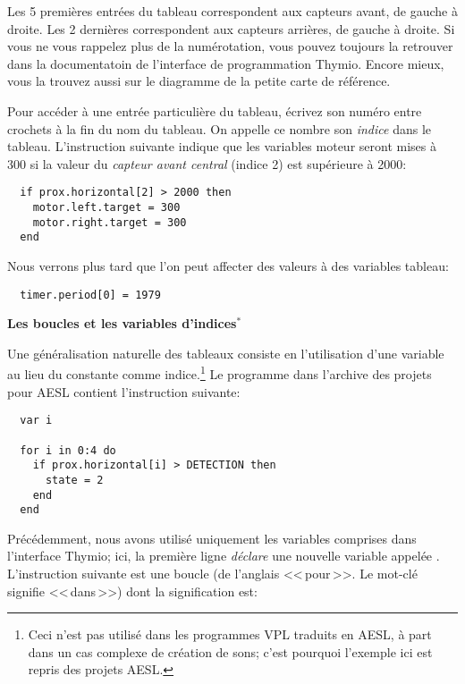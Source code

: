 Les 5 premières entrées du tableau correspondent aux capteurs avant, de gauche à droite.
Les 2 dernières correspondent aux capteurs arrières, de gauche à droite.
Si vous ne vous rappelez plus de la numérotation, vous pouvez toujours la retrouver 
dans la documentatoin de l'interface de programmation Thymio.
Encore mieux, vous la trouvez aussi sur le diagramme de la petite carte de référence.

Pour accéder à une entrée particulière du tableau, écrivez son numéro entre crochets à la fin 
du nom du tableau. On appelle ce nombre son \emph{indice} dans le tableau.
L'instruction suivante indique que les variables moteur seront mises à 300 si la valeur du \emph{capteur
avant central} (indice 2) est supérieure à 2000:

\begin{footnotesize}
\begin{verbatim}
  if prox.horizontal[2] > 2000 then
    motor.left.target = 300
    motor.right.target = 300
  end
\end{verbatim}
\end{footnotesize}

Nous verrons plus tard que l'on peut affecter des valeurs à des variables tableau:
\begin{footnotesize}
\begin{verbatim}
  timer.period[0] = 1979
\end{verbatim}
\end{footnotesize}

\textbf{\large Les boucles  et les variables d'indices$^*$}

Une généralisation naturelle des tableaux consiste en l'utilisation d'une variable au lieu du
constante comme indice.\footnote{Ceci n'est pas utilisé dans les programmes VPL traduits en AESL,
à part dans un cas complexe de création de sons; c'est pourquoi l'exemple ici est repris des projets
AESL.}
Le programme  dans l'archive des projets pour AESL contient l'instruction suivante:

\begin{footnotesize}
\begin{verbatim}
  var i

  for i in 0:4 do
    if prox.horizontal[i] > DETECTION then
      state = 2
    end
  end
\end{verbatim}
\end{footnotesize}

Précédemment, nous avons utilisé uniquement les variables comprises dans l'interface Thymio;
ici, la première ligne \emph{déclare} une nouvelle variable appelée .
L'instruction suivante est une boucle  (de l'anglais <<\,pour\,>>. Le mot-clé  signifie <<\,dans\,>>) dont la signification est: 

